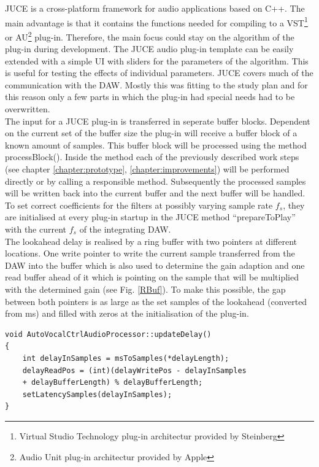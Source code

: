 JUCE is a cross-platform framework for audio applications based on C++. The main advantage is that it contains the functions needed for compiling to a VST\footnote{Virtual Studio Technology plug-in architectur provided by Steinberg} or AU\footnote{Audio Unit plug-in architectur provided by Apple} plug-in. Therefore, the main focus could stay on the algorithm of the plug-in during development. The JUCE audio plug-in template can be easily extended with a simple UI with sliders for the parameters of the algorithm. This is useful for testing the effects of individual parameters. JUCE covers much of the communication with the DAW. Mostly this was fitting to the study plan and for this reason only a few parts in which the plug-in had special needs had to be overwritten.\\
The input for a JUCE plug-in is transferred in seperate buffer blocks. Dependent on the current set of the buffer size the plug-in will receive a buffer block of a known amount of samples. This buffer block will be processed using the method processBlock(). Inside the method each of the previously described work steps (see chapter \ref{chapter:prototype}, \ref{chapter:improvements}) will be performed directly or by calling a responsible method. Subsequently the processed samples will be written back into the current buffer and the next buffer will be handled.\\
To set correct coefficients for the filters at possibly varying sample rate $f_s$, they are initialised at every plug-in startup in the JUCE method “prepareToPlay” with the current $f_s$ of the integrating DAW.\\
The lookahead delay is realised by a ring buffer with two pointers at different locations. One write pointer to write the current sample transferred from the DAW into the buffer which is also used to determine the gain adaption and one read buffer ahead of it which is pointing on the sample that will be multiplied with the determined gain (see Fig. \ref{RBuf}). To make this possible, the gap between both pointers is as large as the set samples of the lookahead (converted from ms) and filled with zeros at the initialisation of the plug-in.\\

\begin{lstlisting}[frame=single]
void AutoVocalCtrlAudioProcessor::updateDelay()
{
    int delayInSamples = msToSamples(*delayLength);
    delayReadPos = (int)(delayWritePos - delayInSamples
    + delayBufferLength) % delayBufferLength;
    setLatencySamples(delayInSamples);
}
\end{lstlisting}

